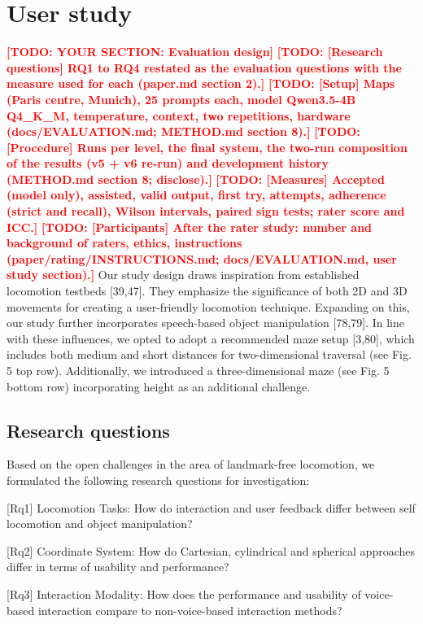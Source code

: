 \documentclass[preprint,12pt]{elsarticle}
\newcommand{\reftext}[1]{{\color{gray}#1}}   %
\newcommand{\todo}[1]{\textcolor{red}{\textbf{[TODO: #1]}}}
\begin{document}
\section{User study}
\todo{YOUR SECTION: Evaluation design}
\todo{[Research questions] RQ1 to RQ4 restated as the evaluation questions with the measure used for each (paper.md section 2).}
\todo{[Setup] Maps (Paris centre, Munich), 25 prompts each, model Qwen3.5-4B Q4\_K\_M, temperature, context, two repetitions, hardware (docs/EVALUATION.md; METHOD.md section 8).}
\todo{[Procedure] Runs per level, the final system, the two-run composition of the results (v5 + v6 re-run) and development history (METHOD.md section 8; disclose).}
\todo{[Measures] Accepted (model only), assisted, valid output, first try, attempts, adherence (strict and recall), Wilson intervals, paired sign tests; rater score and ICC.}
\todo{[Participants] After the rater study: number and background of raters, ethics, instructions (paper/rating/INSTRUCTIONS.md; docs/EVALUATION.md, user study section).}
\reftext{Our study design draws inspiration from established locomotion testbeds [39,47]. They emphasize the significance of both 2D and 3D movements for creating a user-friendly locomotion technique. Expanding on this, our study further incorporates speech-based object manipulation [78,79]. In line with these influences, we opted to adopt a recommended maze setup [3,80], which includes both medium and short distances for two-dimensional traversal (see Fig. 5 top row). Additionally, we introduced a three-dimensional maze (see Fig. 5 bottom row) incorporating height as an additional challenge.}

\subsection{Research questions}
\reftext{Based on the open challenges in the area of landmark-free locomotion, we formulated the following research questions for investigation:}

\reftext{[Rq1] Locomotion Tasks: How do interaction and user feedback differ between self locomotion and object manipulation?}

\reftext{[Rq2] Coordinate System: How do Cartesian, cylindrical and spherical approaches differ in terms of usability and performance?}

\reftext{[Rq3] Interaction Modality: How does the performance and usability of voice-based interaction compare to non-voice-based interaction methods?}
\end{document}
